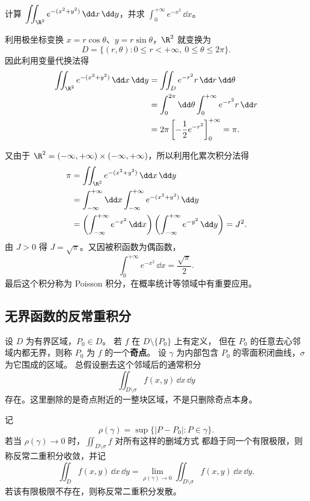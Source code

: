 \begin{example}[Poisson 积分]
计算 $\displaystyle\iint_{\R^2}e^{-(x^2+y^2)}\,\dd x\,\dd y$，并求
$\displaystyle\int_0^{+\infty}e^{-x^2}\,\dd x$。
\end{example}
\begin{solution}
利用极坐标变换 $x=r\cos\theta$、$y=r\sin\theta$，$\R^2$ 就变换为
\[
D=\{(r,\theta):0\le r<+\infty,\ 0\le\theta\le2\pi\}.
\]
因此利用变量代换法得
\begin{align*}
\displaystyle\iint_{\R^2}e^{-(x^2+y^2)}\,\dd x\,\dd y
&=\displaystyle\iint_D e^{-r^2}r\,\dd r\,\dd\theta\\
&=\int_0^{2\pi}\dd\theta\int_0^{+\infty}e^{-r^2}r\,\dd r\\
&=2\pi\left[-\frac12e^{-r^2}\right]_0^{+\infty}=\pi.
\end{align*}


又由于 $\R^2=(-\infty,+\infty)\times(-\infty,+\infty)$，所以利用化累次积分法得
\begin{align*}
\pi
&=\displaystyle\iint_{\R^2}e^{-(x^2+y^2)}\,\dd x\,\dd y\\
&=\int_{-\infty}^{+\infty}\dd x\int_{-\infty}^{+\infty}
 e^{-(x^2+y^2)}\,\dd y\\
&=\left(\int_{-\infty}^{+\infty}e^{-x^2}\,\dd x\right)
  \left(\int_{-\infty}^{+\infty}e^{-y^2}\,\dd y\right)=J^2.
\end{align*}
由 $J>0$ 得 $J=\sqrt\pi$。又因被积函数为偶函数，
\[
\int_0^{+\infty}e^{-x^2}\,\dd x=\frac{\sqrt\pi}{2}.
\]
最后这个积分称为 Poisson 积分，在概率统计等领域中有重要应用。
\end{solution}

\subsection*{无界函数的反常重积分}

设 $D$ 为有界区域，$P_0\in D$。
若 $f$ 在 $D\setminus\{P_0\}$ 上有定义，
但在 $P_0$ 的任意去心邻域内都无界，则称 $P_0$ 为 $f$ 的一个\textbf{奇点}。
设 $\gamma$ 为内部包含 $P_0$ 的零面积闭曲线，$\sigma$ 为它围成的区域。
总假设删去这个邻域后的通常积分
\[
\displaystyle\iint_{D\setminus\sigma}f(x,y)\,\dd x\,\dd y
\]
存在。这里删除的是奇点附近的一整块区域，不是只删除奇点本身。

\begin{definition}[单个奇点的反常二重积分]
记
\[
\rho(\gamma)=\sup\{|P-P_0|:P\in\gamma\}.
\]
若当 $\rho(\gamma)\to0$ 时，$\displaystyle\iint_{D\setminus\sigma}f$ 对所有这样的删域方式
都趋于同一个有限极限，则称反常二重积分收敛，并记
\[
\displaystyle\iint_Df(x,y)\,\dd x\,\dd y
=\lim_{\rho(\gamma)\to0}\displaystyle\iint_{D\setminus\sigma}f(x,y)\,\dd x\,\dd y.
\]
若该有限极限不存在，则称反常二重积分发散。
\end{definition}

